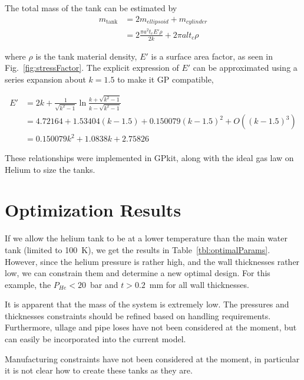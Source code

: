 \documentclass[12pt]{article}
\begin{document}
The total mass of the tank can be estimated by 
\begin{align}
m_\text{tank} &= 2 m_{ellipsoid} + m_{cylinder}\\
&= 2 \frac{\pi a^2 t_e E' \rho}{2k} + 2\pi a l t_c \rho
\end{align}

where $\rho$ is the tank material density, $E'$ is a surface area factor, as seen in Fig.~\ref{fig:stressFactor}. The explicit expression of $E'$ can be approximated using a series expansion about $k=1.5$ to make it GP compatible,

\begin{align}
E'  &= 2 k+\frac{1}{\sqrt{k^{2}-1}} \ln \frac{k+\sqrt{k^{2}-1}}{k-\sqrt{k^{2}-1}}\\
&= 4.72164+1.53404 (k-1.5)+0.150079 (k-1.5)^2+O\left((k-1.5)^3\right)\\
&= 0.150079 k^2+1.0838 k+2.75826
\end{align}

These relationships were implemented in GPkit, along with the ideal gas law on Helium to size the tanks. 

\section{Optimization Results}

If we allow the helium tank to be at a lower temperature than the main water tank (limited to 100~K), we get the results in Table~\ref{tbl:optimalParams}. However, since the helium pressure is rather high, and the wall thicknesses rather low, we can constrain them and determine a new optimal design. For this example, the $P_{He}< 20$~bar and $t>0.2$~mm for all wall thicknesses. 

It is apparent that the mass of the system is extremely low. The pressures and thicknesses constraints should be refined based on handling requirements. Furthermore, ullage and pipe loses have not been considered at the moment, but can easily be incorporated into the current model. 

Manufacturing constraints have not been considered at the moment, in particular it is not clear how to create these tanks as they are. 
\end{document}
